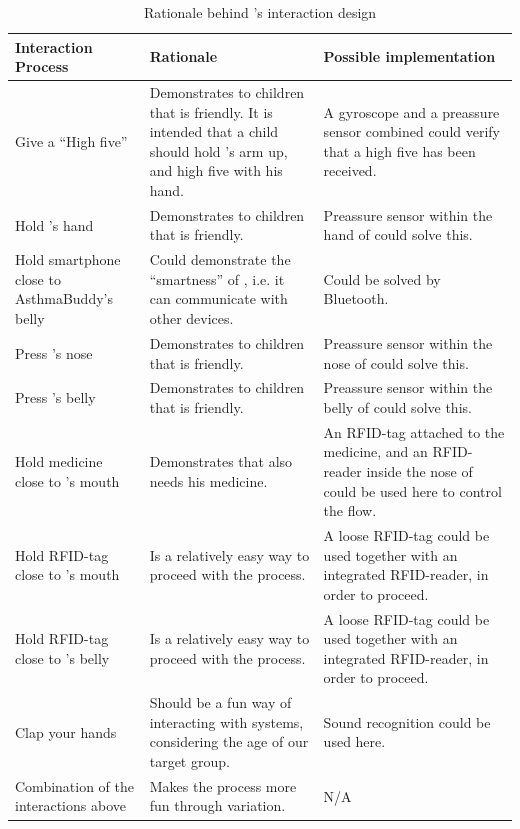 \begin{singlespacing}
\begin{table}[H]
	\centering
	\begin{tabular}{| p{3.0cm} | p{5.0cm} | p{5.0cm} |}
		\hline
		\textbf{Interaction Process} & \textbf{Rationale} & \textbf{Possible implementation} \\
		\hline
		Give \buddy{} a ``High five'' & Demonstrates to children that \buddy{} is friendly. It is intended that a child should hold \buddy{}'s arm up, and high five \buddy{} with his hand. & A gyroscope and a preassure sensor combined could verify that a high five has been received. \\
		\hline
		Hold \buddy{}'s hand & Demonstrates to children that \buddy{} is friendly. & Preassure sensor within the hand of \buddy{} could solve this. \\
		\hline
		Hold smartphone close to AsthmaBuddy's belly & Could demonstrate the ``smartness'' of \buddy{}, i.e. it can communicate with other devices. & Could be solved by Bluetooth. \\
		\hline 
		Press \buddy{}'s nose & Demonstrates to children that \buddy{} is friendly. & Preassure sensor within the nose of \buddy{} could solve this. \\
		\hline
		Press \buddy{}'s belly & Demonstrates to children that \buddy{} is friendly. & Preassure sensor within the belly of \buddy{} could solve this. \\
		\hline
		Hold medicine close to \buddy{}'s mouth & Demonstrates that \buddy{} also needs his medicine. & An RFID-tag attached to the medicine, and an RFID-reader inside the nose of \buddy{} could be used here to control the flow. \\ 
		\hline
		Hold RFID-tag close to \buddy{}'s mouth & Is a relatively easy way to proceed with the process. & A loose RFID-tag could be used together with an integrated RFID-reader, in order to proceed. \\ 
		\hline
		Hold RFID-tag close to \buddy{}'s belly & Is a relatively easy way to proceed with the process. & A loose RFID-tag could be used together with an integrated RFID-reader, in order to proceed. \\
		\hline
		Clap your hands & Should be a fun way of interacting with systems, considering the age of our target group. & Sound recognition could be used here. \\ 
		\hline
		Combination of the interactions above & Makes the process more fun through variation. & N/A \\
		\hline
	\end{tabular}
	\label{tab:interaction-rationale}
	\caption{Rationale behind \buddy{}'s interaction design}
\end{table}
\end{singlespacing}

